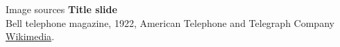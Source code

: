 \documentclass[handout,aspectratio=169]{beamer}
\begin{document}
	\backupbegin

	\begin{frame}[noframenumbering]{Image sources}
		\small
		\textbf{Title slide}\\Bell telephone magazine, 1922,  American Telephone and Telegraph Company\\ \href{https://commons.wikimedia.org/wiki/File:Bell_telephone_magazine_(1922)_(14733423296).jpg}{Wikimedia}.
	\end{frame}

	\backupend
	
\end{document}
